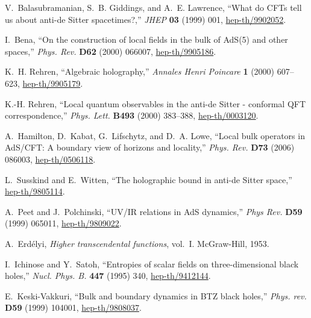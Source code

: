 \documentclass[12pt]{article}
\begin{document}
\begin{thebibliography}{10}
V.~Balasubramanian, S.~B. Giddings, and A.~E. Lawrence, ``What do CFTs tell us
  about anti-de Sitter spacetimes?,'' {\em JHEP} {\bf 03} (1999) 001,
\href{http://www.arXiv.org/abs/hep-th/9902052}{ hep-th/9902052}.

I.~Bena, ``On the construction of local fields in the bulk of AdS(5) and other
  spaces,'' {\em Phys. Rev.} {\bf D62} (2000) 066007,
\href{http://www.arXiv.org/abs/hep-th/9905186}{ hep-th/9905186}.

K.~H. Rehren, ``Algebraic holography,'' {\em Annales Henri Poincare} {\bf 1}
  (2000) 607--623,
\href{http://www.arXiv.org/abs/hep-th/9905179}{ hep-th/9905179}.

K.-H. Rehren, ``Local quantum observables in the anti-de Sitter - conformal QFT
  correspondence,'' {\em Phys. Lett.} {\bf B493} (2000) 383--388,
\href{http://www.arXiv.org/abs/hep-th/0003120}{ hep-th/0003120}.

A.~Hamilton, D.~Kabat, G.~Lifschytz, and D.~A. Lowe, ``Local bulk operators in
  AdS/CFT: A boundary view of horizons and locality,'' {\em Phys. Rev.} {\bf
  D73} (2006) 086003,
\href{http://www.arXiv.org/abs/hep-th/0506118}{ hep-th/0506118}.

L.~Susskind and E.~Witten, ``The holographic bound in anti-de Sitter space,''
\href{http://www.arXiv.org/abs/hep-th/9805114}{ hep-th/9805114}.

A.~Peet and J.~Polchinski, ``UV/IR relations in AdS dynamics,'' {\em Phys Rev.}
  {\bf D59} (1999) 065011,
\href{http://www.arXiv.org/abs/hep-th/9809022}{ hep-th/9809022}.

A.~Erd\'elyi, {\em Higher transcendental functions}, vol.~I.
\newblock McGraw-Hill, 1953.

I.~Ichinose and Y.~Satoh, ``Entropies of scalar fields on three-dimensional
  black holes,'' {\em Nucl. Phys. B.} {\bf 447} (1995) 340,
\href{http://www.arXiv.org/abs/hep-th/9412144}{ hep-th/9412144}.

E.~Keski-Vakkuri, ``Bulk and boundary dynamics in BTZ black holes,'' {\em Phys.
  rev.} {\bf D59} (1999) 104001,
\href{http://www.arXiv.org/abs/hep-th/9808037}{ hep-th/9808037}.


\end{thebibliography}
\end{document}
